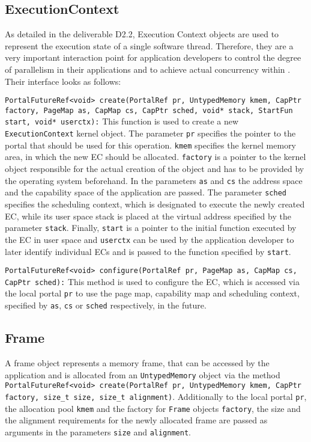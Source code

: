 \subsection{ExecutionContext}
As detailed in the deliverable D2.2, Execution Context objects are used to
represent the execution state of a single software thread. Therefore, they are a
very important interaction point for application developers to control the
degree of parallelism in their applications and to achieve actual concurrency
within \mythos. Their interface looks as follows:

\texttt{PortalFutureRef<void> create(PortalRef pr, UntypedMemory kmem,
CapPtr factory, PageMap as, CapMap cs, CapPtr sched, void* stack, StartFun
start, void* userctx):}
This function is used to create a new \texttt{ExecutionContext} kernel object.
The parameter \texttt{pr} specifies the pointer to the portal that should be
used for this operation. \texttt{kmem} specifies the kernel memory area, in
which the new EC should be allocated. \texttt{factory} is a pointer to the
kernel object responsible for the actual creation of the object and has to be
provided by the operating system beforehand. In the parameters \texttt{as} and
\texttt{cs} the address space and the capability space of the application are
passed. The parameter \texttt{sched} specifies the scheduling context, which is
designated to execute the newly created EC, while its user space stack is placed
at the virtual address specified by the parameter \texttt{stack}. Finally,
\texttt{start} is a pointer to the initial function  executed by the EC in user
space and \texttt{userctx} can be used by the application developer to later
identify individual ECs and is passed to the function specified by
\texttt{start}.

  \texttt{PortalFutureRef<void> configure(PortalRef pr, PageMap as, CapMap cs,
  CapPtr sched):} This method is used to configure the EC, which is accessed via
  the local portal \texttt{pr} to use the page map, capability map and
  scheduling context, specified by \texttt{as}, \texttt{cs} or \texttt{sched}
  respectively, in the future.

\subsection{Frame}
A frame object represents a memory frame, that can be accessed by the
application and is allocated from an \texttt{UntypedMemory} object via the
method \texttt{PortalFutureRef<void> create(PortalRef pr, UntypedMemory kmem,
CapPtr factory, size\_t size, size\_t alignment)}. Additionally to the local
portal \texttt{pr}, the allocation pool \texttt{kmem} and the factory for
\texttt{Frame} objects \texttt{factory}, the size and the alignment requirements
for the newly allocated frame are passed as arguments in the parameters
\texttt{size} and \texttt{alignment}.

